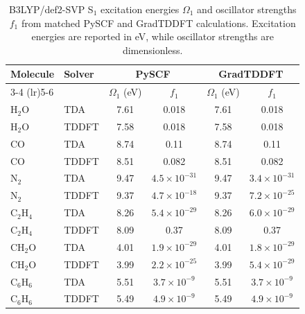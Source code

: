\begin{table}[t]
\centering
\caption{B3LYP/def2-SVP S$_1$ excitation energies \(\Omega_1\) and oscillator strengths \(f_1\) from matched PySCF and GradTDDFT calculations. Excitation energies are reported in eV, while oscillator strengths are dimensionless.}
\label{tab:b3lyp-s1-excitation-oscillator}
\begin{tabular}{llcccc}
\toprule
\multirow{2}{*}{Molecule} & \multirow{2}{*}{Solver} & \multicolumn{2}{c}{PySCF} & \multicolumn{2}{c}{GradTDDFT} \\
\cmidrule(lr){3-4} \cmidrule(lr){5-6}
 & & \(\Omega_1\) (eV) & \(f_1\) & \(\Omega_1\) (eV) & \(f_1\) \\
\midrule
H$_2$O & TDA & 7.61 & 0.018 & 7.61 & 0.018 \\
H$_2$O & TDDFT & 7.58 & 0.018 & 7.58 & 0.018 \\
CO & TDA & 8.74 & 0.11 & 8.74 & 0.11 \\
CO & TDDFT & 8.51 & 0.082 & 8.51 & 0.082 \\
N$_2$ & TDA & 9.47 & \(4.5\times 10^{-31}\) & 9.47 & \(3.4\times 10^{-31}\) \\
N$_2$ & TDDFT & 9.37 & \(4.7\times 10^{-18}\) & 9.37 & \(7.2\times 10^{-25}\) \\
C$_2$H$_4$ & TDA & 8.26 & \(5.4\times 10^{-29}\) & 8.26 & \(6.0\times 10^{-29}\) \\
C$_2$H$_4$ & TDDFT & 8.09 & 0.37 & 8.09 & 0.37 \\
CH$_2$O & TDA & 4.01 & \(1.9\times 10^{-29}\) & 4.01 & \(1.8\times 10^{-29}\) \\
CH$_2$O & TDDFT & 3.99 & \(2.2\times 10^{-25}\) & 3.99 & \(5.4\times 10^{-29}\) \\
C$_6$H$_6$ & TDA & 5.51 & \(3.7\times 10^{-9}\) & 5.51 & \(3.7\times 10^{-9}\) \\
C$_6$H$_6$ & TDDFT & 5.49 & \(4.9\times 10^{-9}\) & 5.49 & \(4.9\times 10^{-9}\) \\
\bottomrule
\end{tabular}
\end{table}
